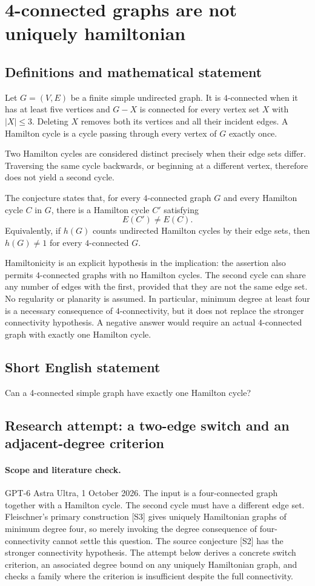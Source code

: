 \documentclass[11pt,a4paper]{article}
\begin{document}
\section*{4-connected graphs are not uniquely hamiltonian}\label{statement}

\subsection{Definitions and mathematical statement}
Let $G=(V,E)$ be a finite simple undirected graph.
It is $4$-connected when it has at least five vertices
and $G-X$ is connected for every vertex set $X$ with
$|X|\leq3$. Deleting $X$ removes both its vertices and
all their incident edges. A Hamilton cycle is a cycle
passing through every vertex of $G$ exactly once.

Two Hamilton cycles are considered distinct precisely
when their edge sets differ. Traversing the same cycle
backwards, or beginning at a different vertex, therefore
does not yield a second cycle.

The conjecture states that, for every $4$-connected graph
$G$ and every Hamilton cycle $C$ in $G$, there is a
Hamilton cycle $C'$ satisfying
\[
 E(C')\neq E(C).
\]
Equivalently, if $h(G)$ counts undirected Hamilton cycles
by their edge sets, then $h(G)\neq1$ for every
$4$-connected $G$.

Hamiltonicity is an explicit hypothesis in the implication:
the assertion also permits $4$-connected graphs with no
Hamilton cycles. The second cycle can share any number
of edges with the first, provided that they are not the
same edge set. No regularity or planarity is assumed.
In particular, minimum degree at least four is a necessary
consequence of $4$-connectivity, but it does not replace
the stronger connectivity hypothesis. A negative answer
would require an actual $4$-connected graph with exactly
one Hamilton cycle.
\subsection{Short English statement}
Can a 4-connected simple graph have exactly one Hamilton cycle?
\subsection{Research attempt: a two-edge switch and an adjacent-degree criterion}
\paragraph{Scope and literature check.}
GPT-6 Astra Ultra, 1 October 2026. The input is a four-connected
graph together with a Hamilton cycle. The second cycle must have
a different edge set. Fleischner's primary construction [S3] gives
uniquely Hamiltonian graphs of minimum degree four, so merely invoking
the degree consequence of four-connectivity cannot settle this question.
The source conjecture [S2] has the stronger connectivity hypothesis.
The attempt below derives a concrete switch criterion, an associated
degree bound on any uniquely Hamiltonian graph, and checks a family
where the criterion is insufficient despite the full connectivity.
\end{document}
